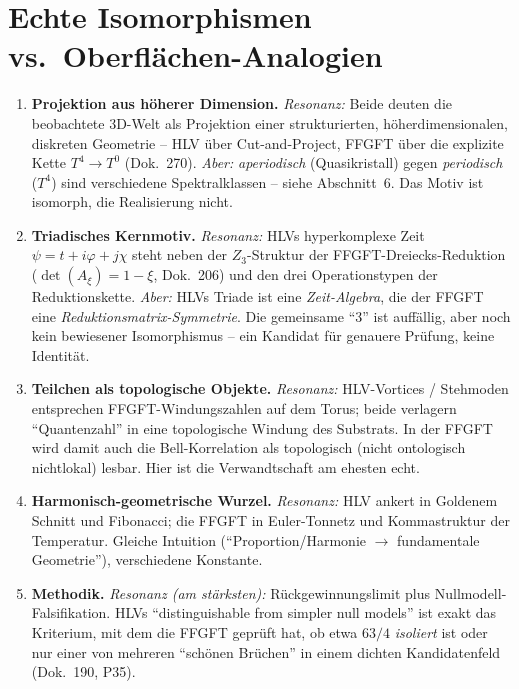 \section{Echte Isomorphismen vs.\ Oberflächen-Analogien}

\begin{enumerate}
\item \textbf{Projektion aus höherer Dimension.}
\emph{Resonanz:} Beide deuten die beobachtete 3D-Welt als Projektion einer strukturierten,
höherdimensionalen, diskreten Geometrie -- HLV über Cut-and-Project, FFGFT über die explizite
Kette $T^4\!\to\!T^0$ (Dok.~270).
\emph{Aber:} \emph{aperiodisch} (Quasikristall) gegen \emph{periodisch} ($T^4$) sind verschiedene
Spektralklassen -- siehe Abschnitt~6. Das Motiv ist isomorph, die Realisierung nicht.

\item \textbf{Triadisches Kernmotiv.}
\emph{Resonanz:} HLVs hyperkomplexe Zeit $\psi=t+i\varphi+j\chi$ steht neben der $Z_3$-Struktur
der FFGFT-Dreiecks-Reduktion ($\det(A_\xi)=1-\xi$, Dok.~206) und den drei Operationstypen der
Reduktionskette.
\emph{Aber:} HLVs Triade ist eine \emph{Zeit-Algebra}, die der FFGFT eine
\emph{Reduktionsmatrix-Symmetrie}. Die gemeinsame \enquote{3} ist auffällig, aber noch kein
bewiesener Isomorphismus -- ein Kandidat für genauere Prüfung, keine Identität.

\item \textbf{Teilchen als topologische Objekte.}
\emph{Resonanz:} HLV-Vortices / Stehmoden entsprechen FFGFT-Windungszahlen auf dem Torus;
beide verlagern \enquote{Quantenzahl} in eine topologische Windung des Substrats. In der FFGFT
wird damit auch die Bell-Korrelation als topologisch (nicht ontologisch nichtlokal) lesbar.
Hier ist die Verwandtschaft am ehesten echt.

\item \textbf{Harmonisch-geometrische Wurzel.}
\emph{Resonanz:} HLV ankert in Goldenem Schnitt und Fibonacci; die FFGFT in Euler-Tonnetz und
Kommastruktur der Temperatur. Gleiche Intuition (\enquote{Proportion/Harmonie $\to$ fundamentale
Geometrie}), verschiedene Konstante.

\item \textbf{Methodik.}
\emph{Resonanz (am stärksten):} Rückgewinnungslimit plus Nullmodell-Falsifikation. HLVs
\enquote{distinguishable from simpler null models} ist exakt das Kriterium, mit dem die FFGFT
geprüft hat, ob etwa $63/4$ \emph{isoliert} ist oder nur einer von mehreren \enquote{schönen
Brüchen} in einem dichten Kandidatenfeld (Dok.~190, P35).
\end{enumerate}

